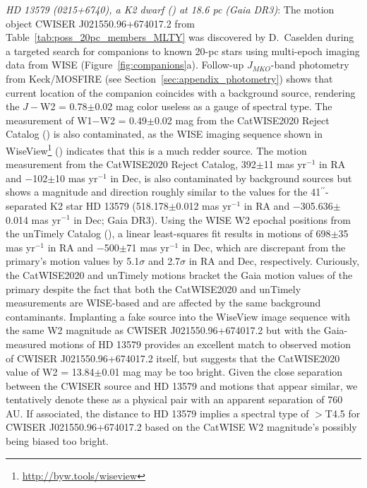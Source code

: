 \documentclass[twocolumn,tighten,twocolappendix]{aastex631}
\begin{document}
{\it HD 13579 (0215+6740), a K2 dwarf (\citealt{bidelman1985}) at 18.6 pc (Gaia DR3)}: The motion object CWISER J021550.96+674017.2 from Table~\ref{tab:poss_20pc_members_MLTY} was discovered by D.\ Caselden during a targeted search for companions to known 20-pc stars using multi-epoch imaging data from WISE (Figure~\ref{fig:companions}a). Follow-up $J_{MKO}$-band photometry from Keck/MOSFIRE (see Section~\ref{sec:appendix_photometry}) shows that current location of the companion coincides with a background source, rendering the $J-$W2 = 0.78$\pm$0.02 mag color useless as a gauge of spectral type. The measurement of W1$-$W2 = 0.49$\pm$0.02 mag from the CatWISE2020 Reject Catalog (\citealt{marocco2021}) is also contaminated, as the WISE imaging sequence shown in WiseView\footnote{\url{http://byw.tools/wiseview}} (\citealt{caselden2018}) indicates that this is a much redder source. The motion measurement from the CatWISE2020 Reject Catalog, 392$\pm$11 mas yr$^{-1}$ in RA and $-$102$\pm$10 mas yr$^{-1}$ in Dec, is also contaminated by background sources but shows a magnitude and direction roughly similar to the values for the 41$^{\prime\prime}$-separated K2 star HD 13579 (518.178$\pm$0.012 mas yr$^{-1}$ in RA and $-$305.636$\pm$0.014 mas yr$^{-1}$ in Dec; Gaia DR3). Using the WISE W2 epochal positions from the unTimely Catalog (\citealt{meisner2023-untimely}), a linear least-squares fit results in motions of 698$\pm$35 mas yr$^{-1}$ in RA and $-$500$\pm$71 mas yr$^{-1}$ in Dec, which are discrepant from the primary's motion values by 5.1$\sigma$ and 2.7$\sigma$ in RA and Dec, respectively. Curiously, the CatWISE2020 and unTimely motions bracket the Gaia motion values of the primary despite the fact that both the CatWISE2020 and unTimely measurements are WISE-based and are affected by the same background contaminants. Implanting a fake source into the WiseView image sequence with the same W2 magnitude as CWISER J021550.96+674017.2 but with the Gaia-measured motions of HD 13579 provides an excellent match to observed motion of CWISER J021550.96+674017.2 itself, but suggests that the CatWISE2020 value of W2 = 13.84$\pm$0.01 mag may be too bright. Given the close separation between the CWISER source and HD 13579 and motions that appear similar, we tentatively denote these as a physical pair with an apparent separation of 760 AU. If associated, the distance to HD 13579 implies a spectral type of $>$T4.5 for CWISER J021550.96+674017.2 based on the CatWISE W2 magnitude's possibly being biased too bright.
\end{document}
